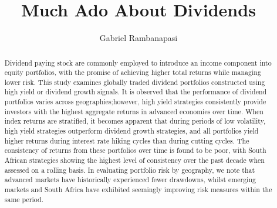 \documentclass[12pt,preprint, authoryear]{elsarticle}
\numberwithin{equation}{section}
\numberwithin{figure}{section}
\numberwithin{table}{section}
\begin{document}
\begin{frontmatter}  %

\title{Much Ado About Dividends}





\author[Add1]{Gabriel Rambanapasi}





\address[Add1]{Stellenbosch University, Cape Town, South Africa}


\begin{abstract}
\small{
Dividend paying stock are commonly employed to introduce an income
component into equity portfolios, with the promise of achieving higher
total returns while managing lower risk. This study examines globally
traded dividend portfolios constructed using high yield or dividend
growth signals. It is observed that the performance of dividend
portfolios varies across geographies;however, high yield strategies
consistently provide investors with the highest aggregate returns in
advanced economies over time. When index returns are stratified, it
becomes apparent that during periods of low volatility, high yield
strategies outperform dividend growth strategies, and all portfolios
yield higher returns during interest rate hiking cycles than during
cutting cycles. The consistency of returns from these portfolios over
time is found to be poor, with South African strategies showing the
highest level of consistency over the past decade when assessed on a
rolling basis. In evaluating portfolio risk by geography, we note that
advanced markets have historically experienced fewer drawdowns, whilst
emerging markets and South Africa have exhibited seemingly improving
risk measures within the same period.
}
\end{abstract}

\vspace{1cm}





\vspace{0.5cm}

\end{frontmatter}

\setcounter{footnote}{0}



\pagestyle{fancy}
\chead{}
\lfoot{}
\lhead{}
\cfoot{}
\end{document}
